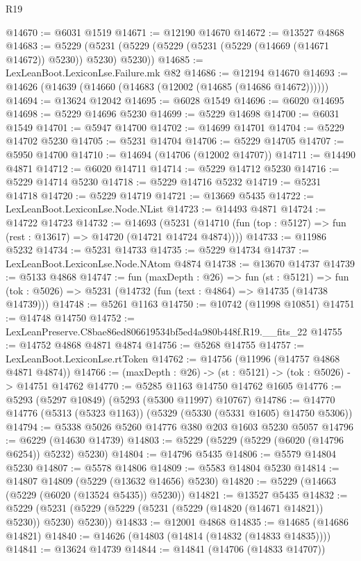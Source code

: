 \begin{lexlean}{R19}
\begin{coremodule}
@14670 := @6031 @1519
@14671 := @12190 @14670
@14672 := @13527 @4868
@14683 := @5229 (@5231 (@5229 (@5229 (@5231 (@5229 (@14669 (@14671 @14672)) @5230)) @5230) @5230))
@14685 := LexLeanBoot.LexiconLse.Failure.mk @82
@14686 := @12194 @14670
@14693 := @14626 (@14639 (@14660 (@14683 (@12002 (@14685 (@14686 @14672))))))
@14694 := @13624 @12042
@14695 := @6028 @1549
@14696 := @6020 @14695
@14698 := @5229 @14696 @5230
@14699 := @5229 @14698
@14700 := @6031 @1549
@14701 := @5947 @14700
@14702 := @14699 @14701
@14704 := @5229 @14702 @5230
@14705 := @5231 @14704
@14706 := @5229 @14705
@14707 := @5950 @14700
@14710 := @14694 (@14706 (@12002 @14707))
@14711 := @14490 @4871
@14712 := @6020 @14711
@14714 := @5229 @14712 @5230
@14716 := @5229 @14714 @5230
@14718 := @5229 @14716 @5232
@14719 := @5231 @14718
@14720 := @5229 @14719
@14721 := @13669 @5435
@14722 := LexLeanBoot.LexiconLse.Node.NList
@14723 := @14493 @4871
@14724 := @14722 @14723
@14732 := @14693
    (@5231 (@14710 (fun (top : @5127) => fun (rest : @13617) => @14720 (@14721 @14724 @4874))))
@14733 := @11986 @5232
@14734 := @5231 @14733
@14735 := @5229 @14734
@14737 := LexLeanBoot.LexiconLse.Node.NAtom @4874
@14738 := @13670 @14737
@14739 := @5133 @4868
@14747 := fun (maxDepth : @26) =>
  fun (st : @5121) =>
  fun (tok : @5026) => @5231 (@14732 (fun (text : @4864) => @14735 (@14738 @14739)))
@14748 := @5261 @1163
@14750 := @10742 (@11998 @10851)
@14751 := @14748 @14750
@14752 := LexLeanPreserve.C8bae86ed806619534bf5ed4a980b448f.R19.__fits_22
@14755 := @14752 @4868 @4871 @4874
@14756 := @5268 @14755
@14757 := LexLeanBoot.LexiconLse.rtToken
@14762 := @14756 (@11996 (@14757 @4868 @4871 @4874))
@14766 := (maxDepth : @26) -> (st : @5121) -> (tok : @5026) -> @14751 @14762
@14770 := @5285 @1163 @14750 @14762 @1605
@14776 := @5293 (@5297 @10849) (@5293 (@5300 @11997) @10767)
@14786 := @14770 @14776 (@5313 (@5323 @1163)) (@5329 (@5330 (@5331 @1605) @14750 @5306))
@14794 := @5338 @5026 @5260 @14776 @380 @203 @1603 @5230 @5057
@14796 := @6229 (@14630 @14739)
@14803 := @5229 (@5229 (@5229 (@6020 (@14796 @6254)) @5232) @5230)
@14804 := @14796 @5435
@14806 := @5579 @14804 @5230
@14807 := @5578 @14806
@14809 := @5583 @14804 @5230
@14814 := @14807 @14809 (@5229 (@13632 @14656) @5230)
@14820 := @5229 (@14663 (@5229 (@6020 (@13524 @5435)) @5230))
@14821 := @13527 @5435
@14832 := @5229 (@5231 (@5229 (@5229 (@5231 (@5229 (@14820 (@14671 @14821)) @5230)) @5230) @5230))
@14833 := @12001 @4868
@14835 := @14685 (@14686 @14821)
@14840 := @14626 (@14803 (@14814 (@14832 (@14833 @14835))))
@14841 := @13624 @14739
@14844 := @14841 (@14706 (@14833 @14707))

\end{coremodule}
\end{lexlean}
